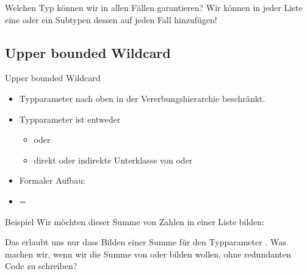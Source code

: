 \documentclass{../tuda-beamer}
\begin{document}
    \begin{frame}[c]{Welchen Typ können wir in allen Fällen garantieren?}
        Wir können in jeder Liste eine  oder ein Subtypen dessen
        auf jeden Fall hinzufügen!

        
    \end{frame}

    \subsection{Upper bounded Wildcard}
    \label{subsec:wildcards-upperbound}
    \begin{frame}[c]{Upper bounded Wildcard}
        \begin{itemize}
            \item Typparameter nach oben in der Vererbungshierarchie beschränkt.
            \item Typparameter ist entweder
            \begin{itemize}
                \item {} oder
                \item direkt oder indirekte Unterklasse von  oder
            \end{itemize}
            \item Formaler Aufbau: 
            \item {} = 
        \end{itemize}
    \end{frame}

    \begin{frame}[c]{Beispiel}
        Wir möchten dieser Summe von Zahlen in einer Liste bilden:

        

        \pause

        Das erlaubt uns nur dass Bilden einer Summe für den Typparameter
        .
        Was machen wir, wenn wir die Summe von  oder 
        bilden wollen, ohne redundanten Code zu schreiben?
    \end{frame}

    \begin{frame}[c]
        
    \end{frame}
\end{document}
